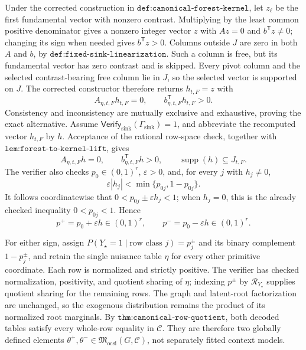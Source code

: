Under the corrected construction in \(\texttt{def:canonical-forest-kernel}\), let \(z_\ell\) be the first fundamental vector with nonzero contrast. Multiplying by the least common positive denominator gives a nonzero integer vector \(z\) with \(Az=0\) and \(b^{\mathsf T}z\ne0\); changing its sign when needed gives \(b^{\mathsf T}z>0\). Columns outside \(J\) are zero in both \(A\) and \(b\), by \(\texttt{def:fixed-sink-linearization}\). Such a column is free, but its fundamental vector has zero contrast and is skipped. Every pivot column and the selected contrast-bearing free column lie in \(J\), so the selected vector is supported on \(J\). The corrected constructor therefore returns \(h_{t,F}=z\) with
\[
 A_{\eta,t,F}h_{t,F}=0,
 \qquad
 b_{\eta,t,F}^{\mathsf T}h_{t,F}>0.
\]
Consistency and inconsistency are mutually exclusive and exhaustive, proving the exact alternative.
Assume \(\mathsf{Verify}_{\mathrm{sink}}(\Gamma_{\mathrm{sink}})=1\), and abbreviate the recomputed vector \(h_{t,F}\) by \(h\). Acceptance of the rational row-space check, together with \(\texttt{lem:forest-to-kernel-lift}\), gives
\[
 A_{\eta,t,F}h=0,
 \qquad
 b_{\eta,t,F}^{\mathsf T}h>0,
 \qquad
 \operatorname{supp}(h)\subseteq J_{t,F}.
\]
The verifier also checks \(p_0\in(0,1)^r\), \(\varepsilon>0\), and, for every \(j\) with \(h_j\ne0\),
\[
 \varepsilon |h_j|<\min\{p_{0j},1-p_{0j}\}.
\]
It follows coordinatewise that \(0<p_{0j}\pm\varepsilon h_j<1\); when \(h_j=0\), this is the already checked inequality \(0<p_{0j}<1\). Hence
\[
 p^+=p_0+\varepsilon h\in(0,1)^r,
 \qquad
 p^-=p_0-\varepsilon h\in(0,1)^r.
\]

For either sign, assign \(P(Y_\star=1\mid\text{row class }j)=p_j^\pm\) and its binary complement \(1-p_j^\pm\), and retain the single nuisance table \(\eta\) for every other primitive coordinate. Each row is normalized and strictly positive. The verifier has checked normalization, positivity, and quotient sharing of \(\eta\); indexing \(p^\pm\) by \(\mathcal R_{Y_\star}\) supplies quotient sharing for the remaining rows. The graph and latent-root factorization are unchanged, so the exogenous distribution remains the product of its normalized root marginals. By \(\texttt{thm:canonical-row-quotient}\), both decoded tables satisfy every whole-row equality in \(\mathcal C\). They are therefore two globally defined elements \(\theta^+,\theta^-\in\mathfrak M_{\mathrm{ocsi}}(G,\mathcal C)\), not separately fitted context models.


